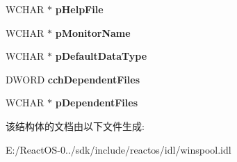 \begin{DoxyCompactItemize}
\mbox{\label{struct___w_i_n_s_p_o_o_l___d_r_i_v_e_r___i_n_f_o__3_aa307178b63463a224edb152f8c3a0aea}} 
W\+C\+H\+AR $\ast$ {\bfseries p\+Help\+File}
\item 
\mbox{\label{struct___w_i_n_s_p_o_o_l___d_r_i_v_e_r___i_n_f_o__3_a8de5ad7549bb20b9d42a8dd56cab979b}} 
W\+C\+H\+AR $\ast$ {\bfseries p\+Monitor\+Name}
\item 
\mbox{\label{struct___w_i_n_s_p_o_o_l___d_r_i_v_e_r___i_n_f_o__3_ad74301399bec725ab79fd781eb251a37}} 
W\+C\+H\+AR $\ast$ {\bfseries p\+Default\+Data\+Type}
\item 
\mbox{\label{struct___w_i_n_s_p_o_o_l___d_r_i_v_e_r___i_n_f_o__3_a6803f94dd0021b5b3ad8c2900bca51ab}} 
D\+W\+O\+RD {\bfseries cch\+Dependent\+Files}
\item 
\mbox{\label{struct___w_i_n_s_p_o_o_l___d_r_i_v_e_r___i_n_f_o__3_aed772eee5b0128b33494d36913a2c6bc}} 
W\+C\+H\+AR $\ast$ {\bfseries p\+Dependent\+Files}
\end{DoxyCompactItemize}


该结构体的文档由以下文件生成\+:\begin{DoxyCompactItemize}
\item 
E\+:/\+React\+O\+S-\/0../sdk/include/reactos/idl/winspool.\+idl\end{DoxyCompactItemize}
